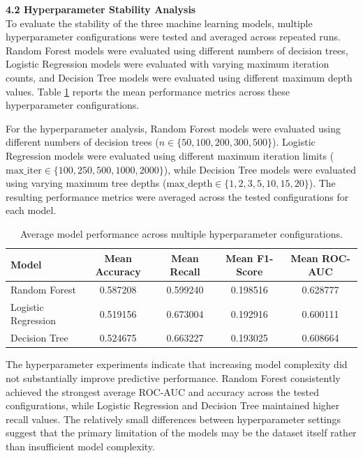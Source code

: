 \documentclass{article}
\begin{document}
\textbf{4.2 Hyperparameter Stability Analysis} \\

To evaluate the stability of the three machine learning models, multiple hyperparameter configurations were tested and averaged across repeated runs. Random Forest models were evaluated using different numbers of decision trees, Logistic Regression models were evaluated with varying maximum iteration counts, and Decision Tree models were evaluated using different maximum depth values. Table \ref{tab:hyperparameter_results} reports the mean performance metrics across these hyperparameter configurations.

For the hyperparameter analysis, Random Forest models were evaluated using different numbers of decision trees ($n \in \{50,100,200,300,500\}$). Logistic Regression models were evaluated using different maximum iteration limits ($\text{max\_iter} \in \{100,250,500,1000,2000\}$), while Decision Tree models were evaluated using varying maximum tree depths ($\text{max\_depth} \in \{1,2,3,5,10,15,20\}$). The resulting performance metrics were averaged across the tested configurations for each model.

\begin{table}[H]
    \centering
    \begin{tabular}{l c c c c}
        \toprule
        Model & Mean Accuracy & Mean Recall & Mean F1-Score & Mean ROC-AUC \\
        \midrule
        Random Forest & 0.587208 & 0.599240 & 0.198516 & 0.628777 \\
        Logistic Regression & 0.519156 & 0.673004 & 0.192916 & 0.600111 \\
        Decision Tree & 0.524675 & 0.663227 & 0.193025 & 0.608664 \\
        \bottomrule
    \end{tabular}
    \caption{Average model performance across multiple hyperparameter configurations.}
    \label{tab:hyperparameter_results}
\end{table}

The hyperparameter experiments indicate that increasing model complexity did not substantially improve predictive performance. Random Forest consistently achieved the strongest average ROC-AUC and accuracy across the tested configurations, while Logistic Regression and Decision Tree maintained higher recall values. The relatively small differences between hyperparameter settings suggest that the primary limitation of the models may be the dataset itself rather than insufficient model complexity.
\end{document}
